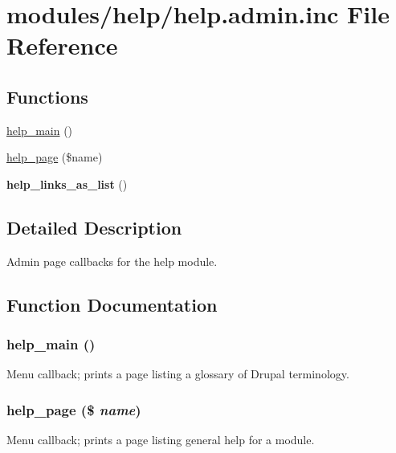 \hypertarget{help_8admin_8inc}{
\section{modules/help/help.admin.inc File Reference}
\label{help_8admin_8inc}
}
\subsection*{Functions}
\begin{CompactItemize}
\item 
\hyperlink{help_8admin_8inc_88c3f4bd225be1ceb6e8e4cdbb788999}{help\_\-main} ()
\item 
\hyperlink{help_8admin_8inc_f233fe63b8d02f02d9a68c9ef5b09b7e}{help\_\-page} (\$name)
\item 
\hypertarget{help_8admin_8inc_1926fc2a19433d20f1b91879796faa84}{
\textbf{help\_\-links\_\-as\_\-list} ()}
\label{help_8admin_8inc_1926fc2a19433d20f1b91879796faa84}

\end{CompactItemize}


\subsection{Detailed Description}
Admin page callbacks for the help module. 

\subsection{Function Documentation}
\hypertarget{help_8admin_8inc_88c3f4bd225be1ceb6e8e4cdbb788999}{
\subsubsection[{help\_\-main}]{\setlength{\rightskip}{0pt plus 5cm}help\_\-main ()}}
\label{help_8admin_8inc_88c3f4bd225be1ceb6e8e4cdbb788999}


Menu callback; prints a page listing a glossary of Drupal terminology. \hypertarget{help_8admin_8inc_f233fe63b8d02f02d9a68c9ef5b09b7e}{
\subsubsection[{help\_\-page}]{\setlength{\rightskip}{0pt plus 5cm}help\_\-page (\$ {\em name})}}
\label{help_8admin_8inc_f233fe63b8d02f02d9a68c9ef5b09b7e}


Menu callback; prints a page listing general help for a module. 